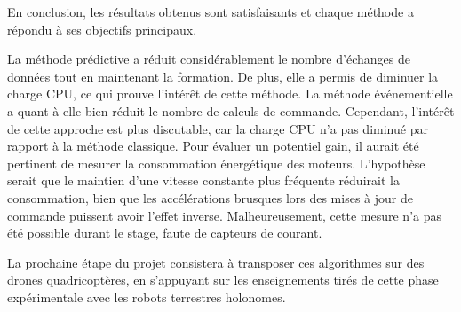 En conclusion, les résultats obtenus sont satisfaisants et chaque méthode a répondu à ses objectifs principaux.

La méthode prédictive a réduit considérablement le nombre d'échanges de données tout en maintenant la formation. De plus, elle a permis de diminuer la charge CPU, ce qui prouve l'intérêt de cette méthode. 
La méthode événementielle a quant à elle bien réduit le nombre de calculs de commande. Cependant, l'intérêt de cette approche est plus discutable, car la charge CPU n'a pas diminué par rapport à la méthode classique. Pour évaluer un potentiel gain, il aurait été pertinent de mesurer la consommation énergétique des moteurs. L'hypothèse serait que le maintien d'une vitesse constante plus fréquente réduirait la consommation, bien que les accélérations brusques lors des mises à jour de commande puissent avoir l'effet inverse. Malheureusement, cette mesure n'a pas été possible durant le stage, faute de capteurs de courant.

La prochaine étape du projet consistera à transposer ces algorithmes sur des drones quadricoptères, en s'appuyant sur les enseignements tirés de cette phase expérimentale avec les robots terrestres holonomes.